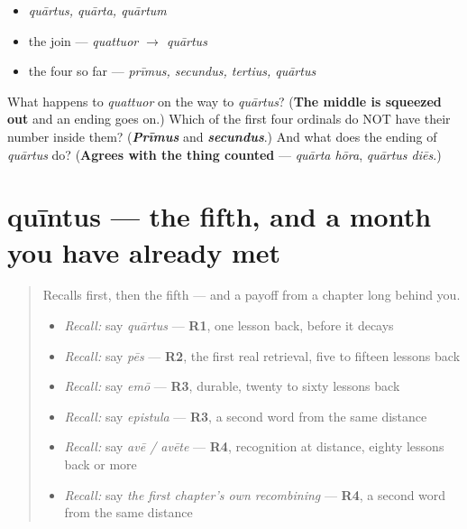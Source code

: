 \begin{itemize}
\raggedright
  \item \emph{quārtus, quārta, quārtum}
  \item the join — \emph{quattuor $\to$ quārtus}
  \item the four so far — \emph{prīmus, secundus, tertius, quārtus}
\end{itemize}

\begin{tcolorbox}[breakable,colback=teal!4,colframe=teal!35!black,title={Before you move on}]
What happens to \emph{quattuor} on the way to \emph{quārtus}? (\textbf{The middle is squeezed out} and an ending goes on.) Which of the first four ordinals do NOT have their number inside them? (\emph{\textbf{Prīmus}} and \emph{\textbf{secundus}}.) And what does the ending of \emph{quārtus} do? (\textbf{Agrees with the thing counted} — \emph{quārta hōra}, \emph{quārtus diēs}.)
\end{tcolorbox}
\section[quīntus, quīnta, quīntum]{quīntus — the fifth, and a month you have already met}

\label{lesson:LA-C55-quintus}



\begin{quote}
Recalls first, then the fifth — and a payoff from a chapter long behind you.

\begin{itemize}
\raggedright
  \item \emph{Recall:} say \emph{quārtus} — \textbf{R1}, one lesson back, before it decays
  \item \emph{Recall:} say \emph{pēs} — \textbf{R2}, the first real retrieval, five to fifteen lessons back
  \item \emph{Recall:} say \emph{emō} — \textbf{R3}, durable, twenty to sixty lessons back
  \item \emph{Recall:} say \emph{epistula} — \textbf{R3}, a second word from the same distance
  \item \emph{Recall:} say \emph{avē / avēte} — \textbf{R4}, recognition at distance, eighty lessons back or more
  \item \emph{Recall:} say \emph{the first chapter's own recombining} — \textbf{R4}, a second word from the same distance
\end{itemize}
\end{quote}

